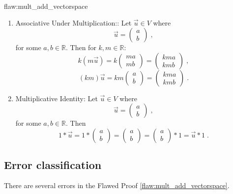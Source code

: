 \begin{flaw}{flaw:mult_add_vectorspace}
\begin{enumerate}
\item Associative Under Multiplication:: Let $\vec{u} \in V$ where $$ \vec{u} = \begin{pmatrix}
a \\
b
\end{pmatrix}\;,$$
for some $a,b \in \mathbb{R}.$ Then for $k,m \in \mathbb{R}:$
$$k\left(m\vec{u}\right) = k \begin{pmatrix}
ma \\
mb
\end{pmatrix} = \begin{pmatrix}
kma \\
kmb
\end{pmatrix}\;, $$
$$\left(km\right)\vec{u} = km \begin{pmatrix}
a \\
b
\end{pmatrix} = \begin{pmatrix}
kma \\
kmb
\end{pmatrix}\;.$$

\item Multiplicative Identity: Let $\vec{u} \in V$ where $$ \vec{u} = \begin{pmatrix}
a \\
b
\end{pmatrix}\;,$$
for some $a,b \in \mathbb{R}.$ Then
$$1 * \vec{u} = 1 * \begin{pmatrix}
a \\
b
\end{pmatrix} = \begin{pmatrix}
a \\
b
\end{pmatrix} = \begin{pmatrix}
a \\
b
\end{pmatrix} * 1 = \vec{u} * 1\;.$$
\end{enumerate}
\end{flaw}

\clearpage
\subsection{Error classification}


There are several errors
 in the Flawed Proof \ref{flaw:mult_add_vectorspace}. %



